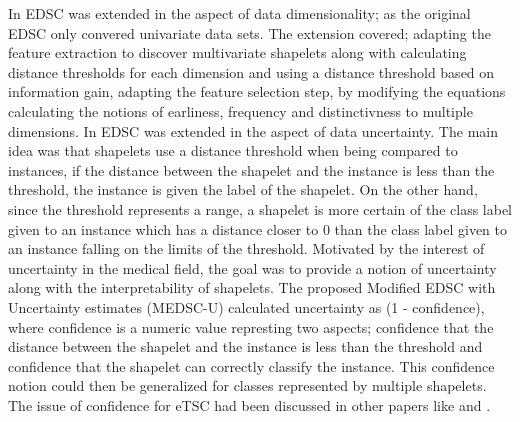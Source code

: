 In \cite{ghalwash2012early} EDSC was extended in the aspect of data dimensionality; as the original EDSC only convered univariate data sets.
The extension covered; adapting the feature extraction to discover multivariate shapelets along with calculating distance thresholds for each dimension and
using a distance threshold based on information gain, adapting the feature selection step, by modifying the equations calculating the notions of earliness, frequency and distinctivness to multiple dimensions.
In \cite{ghalwash2014utilizing} EDSC was extended in the aspect of data uncertainty. The main idea was that shapelets use a distance threshold when being compared to instances,
if the distance between the shapelet and the instance is less than the threshold, the instance is given the label of the shapelet.
On the other hand, since the threshold represents a range, a shapelet is more certain of the class label given to an instance which has a distance closer to 0 than the class label given to an instance falling on the limits of the threshold.
Motivated by the interest of uncertainty in the medical field, the goal was to provide a notion of uncertainty along with the interpretability of shapelets.
The proposed Modified EDSC with Uncertainty estimates (MEDSC-U) calculated uncertainty as (1 - confidence), where confidence is a numeric value represting two aspects;
confidence that the distance between the shapelet and the instance is less than the threshold and confidence that the shapelet can correctly classify the instance.
This confidence notion could then be generalized for classes represented by multiple shapelets.
The issue of confidence for eTSC had been discussed in other papers like \cite{parrish2013classifying} and \cite{lv2019effective}.

